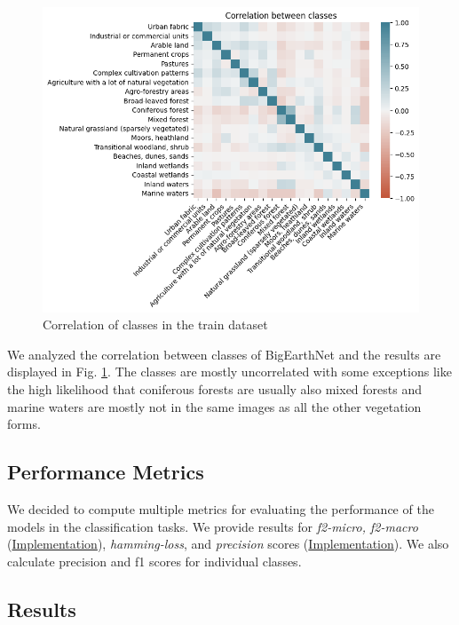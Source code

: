 \begin{figure}[h]
  \centering
  \includegraphics[width=\columnwidth]{images/correlation.png}
  \caption{Correlation of classes in the train dataset}
  \label{fig:correlation}
\end{figure}

We analyzed the correlation between classes of BigEarthNet and the results are displayed in Fig. \ref{fig:correlation}. The classes are mostly uncorrelated with some exceptions like the high likelihood that coniferous forests are usually also mixed forests and marine waters are mostly not in the same images as all the other vegetation forms.

\subsection{Performance Metrics}

We decided to compute multiple metrics for evaluating the performance of the models in the classification tasks. We provide results for \textit{f2-micro, f2-macro} (\href{https://scikit-learn.org/stable/modules/generated/sklearn.metrics.fbeta_score.html}{Implementation}), \textit{hamming-loss}, and \textit{precision} scores (\href{https://scikit-learn.org/stable/modules/generated/sklearn.metrics.precision_score.html}{Implementation}). We also calculate precision and f1 scores for individual classes.

\subsection{Results}

